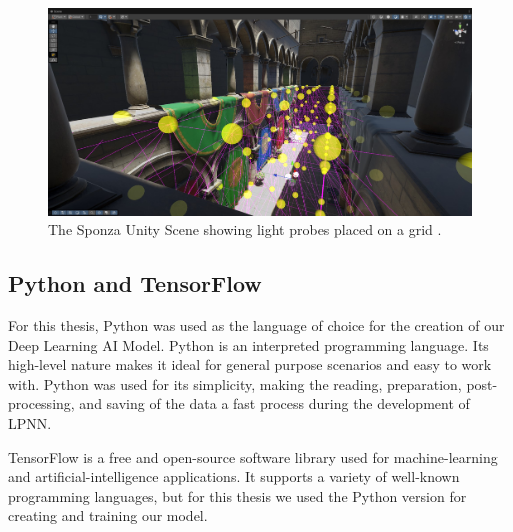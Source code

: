 \begin{figure}[h]
	\centering
	\includegraphics[scale=0.294]{Graphics/Sponza_lightprobes.jpg}
	\caption{The Sponza Unity Scene showing light probes placed on a grid \parencite{Sponza2017}.}
	\label{fig:Sponza_lp}
\end{figure}


\subsection{Python and TensorFlow}
For this thesis, Python was used as the language of choice for the creation of our Deep Learning AI Model. Python is an interpreted programming language. Its high-level nature makes it ideal for general purpose scenarios and easy to work with. Python was used for its simplicity, making the reading, preparation, post-processing, and saving of the data a fast process during the development of LPNN.

TensorFlow is a free and open-source software library used for machine-learning and artificial-intelligence applications. It supports a variety of well-known programming languages, but for this thesis we used the Python version for creating and training our model.

